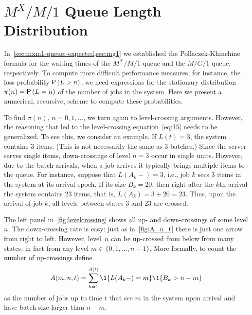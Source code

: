 \section{$M^X/M/1$ Queue Length Distribution}
\label{sec:batch-arrivals}





In~\cref{sec:mxm1-queue:-expected,sec:mg1} we established the Pollaczek-Khinchine formula for the waiting times of the $M^X/M/1$ queue and the $M/G/1$ queue, respectively.
To compute more difficult performance measures, for instance, the loss probability $\P{L>n}$, we need expressions for the stationary distribution $\pi(n)=\P{L=n}$ of the number of jobs in the system.
Here we present a numerical, recursive, scheme to compute these probabilities.

To find $\pi(n)$, $n=0, 1, \ldots$, we turn again to level-crossing arguments.
However, the reasoning that led to the level-crossing equation~\cref{eq:15} needs to be generalized.
To see this, we consider an example.
If $L(t)=3$, the system contains $3$ items.
(This is not necessarily the same as 3 batches.)
Since the server serves single items, down-crossings of level $n=3$ occur in single units.
However, due to the batch arrivals, when a job arrives it typically brings multiple items to the queue.
For instance, suppose that $L(A_k-) = 3$, i.e., job $k$ sees 3 items in the system at its arrival epoch.
If its size $B_k = 20$, then right after the $k$th arrival the system contains 23 items, that is, $L(A_k)=3+20=23$.
Thus, upon the arrival of job $k$, all levels between states $3$ and $23$ are crossed.

The left panel in~\cref{fig:levelcrossing} shows all up- and down-crossings of some level $n$.
The down-crossing rate is easy: just as in~\cref{fig:A_n_t} there is just one arrow from right to left.
However, level~$n$ can be up-crossed from below from many states, in fact from any level $m \in \{0, 1, \ldots, n-1\}$. 
More formally, to count the number of up-crossings define
\begin{equation*}
 A(m,n,t) = \sum_{k=1}^{A(t)}\1{L(A_k-) = m}\1{B_k > n-m}
\end{equation*}
as the number of jobs up to time $t$ that see $m$ in the system upon arrival and have batch size larger than $n-m$.


